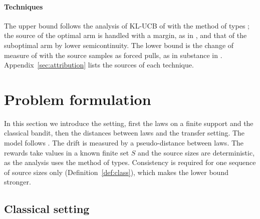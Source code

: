 \documentclass[11pt]{article}
\begin{document}
\paragraph{Techniques} The upper bound follows the analysis of KL-UCB of \citet{CGMMS13} with the
method of types \citep[see][]{CK11}; the source of the optimal arm is handled with a margin, as in
\citet[Lemma~17]{PMRM26}, and that of the suboptimal arm by lower semicontinuity. The lower bound is
the change of measure of \citet[(6)]{GMS19} with the source samples as forced pulls, as in substance
in \citet[Appendix~A]{PMM25}. Appendix~\ref{sec:attribution} lists the sources of each technique.

\section{Problem formulation}\label{sec:setting}

In this section we introduce the setting, first the laws on a finite support and the classical
bandit, then the distances between laws and the transfer setting. The model follows
\citet{PMM25,PMRM26}. The drift is measured by a pseudo-distance between laws. The rewards take
values in a known finite set $S$ and the source sizes are deterministic, as the analysis uses the
method of types. Consistency is required for one sequence of source sizes only
(Definition~\ref{def:class}), which makes the lower bound stronger.

\subsection{Classical setting}
\end{document}
